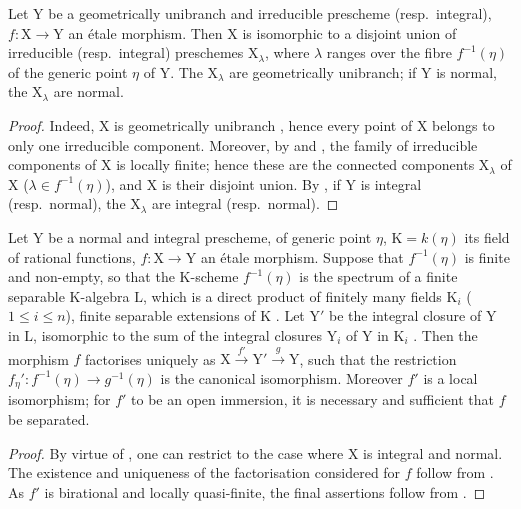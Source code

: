 \begin{proposition}[18.10.7]
\label{IV.18.10.7}
Let $\mathrm{Y}$ be a geometrically unibranch and irreducible prescheme (resp.\ integral), $f:\mathrm{X}\to\mathrm{Y}$ an \'etale morphism.
Then $\mathrm{X}$ is isomorphic to a disjoint union of irreducible (resp.\ integral) preschemes $\mathrm{X}_\lambda$, where $\lambda$ ranges over the fibre $f^{-1}(\eta)$ of the generic point $\eta$ of $\mathrm{Y}$.
The $\mathrm{X}_\lambda$ are geometrically unibranch; if $\mathrm{Y}$ is normal, the $\mathrm{X}_\lambda$ are normal.
\end{proposition}

\begin{proof}
Indeed, $\mathrm{X}$ is geometrically unibranch , hence every point of $\mathrm{X}$ belongs to only one irreducible component. Moreover, by  and , the family of irreducible components of $\mathrm{X}$ is locally finite; hence  these are the connected components $\mathrm{X}_\lambda$ of $\mathrm{X}$ ($\lambda\in f^{-1}(\eta)$), and $\mathrm{X}$ is their disjoint union. By , if $\mathrm{Y}$ is integral (resp.\ normal), the $\mathrm{X}_\lambda$ are integral (resp.\ normal).
\end{proof}

\begin{proposition}[18.10.8]
\label{IV.18.10.8}
Let $\mathrm{Y}$ be a normal and integral prescheme, of generic point $\eta$, $\mathrm{K}=k(\eta)$ its field of rational functions, $f:\mathrm{X}\to\mathrm{Y}$ an \'etale morphism.
Suppose that $f^{-1}(\eta)$ is finite and non-empty, so that the $\mathrm{K}$-scheme $f^{-1}(\eta)$ is the spectrum of a finite separable $\mathrm{K}$-algebra $\mathrm{L}$, which is a direct product of finitely many fields $\mathrm{K}_i$ ($1\leq i\leq n$), finite separable extensions of $\mathrm{K}$ .
Let $\mathrm{Y}'$ be the integral closure of $\mathrm{Y}$ in $\mathrm{L}$, isomorphic to the sum of the integral closures $\mathrm{Y}_i$ of $\mathrm{Y}$ in $\mathrm{K}_i$ .
Then the morphism $f$ factorises uniquely as $\mathrm{X}\xrightarrow{f'}\mathrm{Y}'\xrightarrow{g}\mathrm{Y}$, such that the restriction $f_\eta':f^{-1}(\eta)\to g^{-1}(\eta)$ is the canonical isomorphism.
Moreover $f'$ is a local isomorphism; for $f'$ to be an open immersion, it is necessary and sufficient that $f$ be separated.
\end{proposition}

\begin{proof}
By virtue of , one can restrict to the case where $\mathrm{X}$ is integral and normal.
The existence and uniqueness of the factorisation considered for $f$ follow from .
As $f'$ is birational and locally quasi-finite, the final assertions follow from .
\end{proof}

